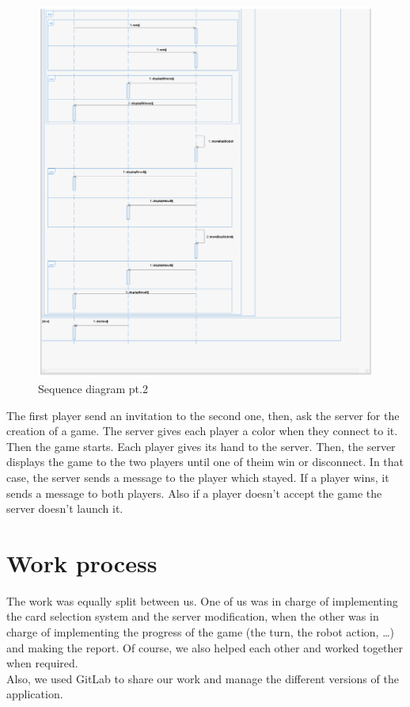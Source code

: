 \documentclass[a4paper, 10pt, oneside]{article}
\begin{document}
	\begin{figure}[h]
		\centering
		\includegraphics[scale=0.35]{img/sequence2.png}
		\caption{Sequence diagram pt.2}
		\label{fig:Sequence2}
	\end{figure}
	The first player send an invitation to the second one, then, ask the server for the creation of a game. The server gives each player a color when they connect to it. Then the game starts. Each player gives its hand to the server. Then, the server displays the game to the two players until one of theim win or disconnect. In that case, the server sends a message to the player which stayed. If a player wins, it sends a message to both players. Also if a player doesn't accept the game the server doesn't launch it.
\\
\newpage
\section{Work process}
	The work was equally split between us. One of us was in charge of implementing the card selection system and the server modification, when the other was in charge of implementing the progress of the game (the turn, the robot action, \ldots) and making the report. Of course, we also helped each other and worked together when required.\\
	Also, we used GitLab to share our work and manage the different versions of the application.
\end{document}
